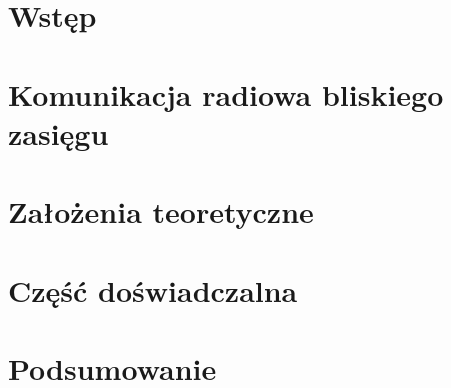 \chapter{Wstęp}


\chapter{Komunikacja radiowa bliskiego zasięgu}


\chapter{Założenia teoretyczne}


\chapter{Część doświadczalna}


\chapter{Podsumowanie}
\label{ch:podsumowanie}

